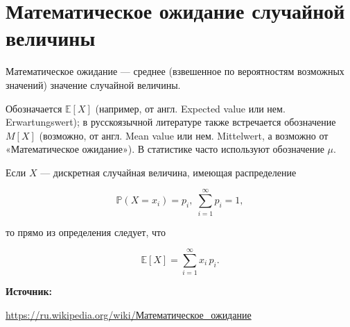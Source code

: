 \documentclass[12pt,a4paper]{scrartcl}
\begin{document}
	
\section{Математическое ожидание случайной величины}

Математическое ожидание —  среднее (взвешенное по вероятностям возможных значений) значение случайной величины.

Обозначается ${\mathbb {E}}[X]$ (например, от англ. Expected value или нем. Erwartungswert); в русскоязычной литературе также встречается обозначение $M[X]$ (возможно, от англ. Mean value или нем. Mittelwert, а возможно от «Математическое ожидание»). В статистике часто используют обозначение $\mu$. 


Если $X$ — дискретная случайная величина, имеющая распределение

$$\mathbb {P} (X=x_{i})=p_{i},\;\sum \limits _{i=1}^{\infty }p_{i}=1,$$

то прямо из определения следует, что

$$\mathbb {E} [X]=\sum \limits _{i=1}^{\infty }x_{i}\,p_{i}.$$

\textbf{Источник:}

\href{https://ru.wikipedia.org/wiki/%D0%9C%D0%B0%D1%82%D0%B5%D0%BC%D0%B0%D1%82%D0%B8%D1%87%D0%B5%D1%81%D0%BA%D0%BE%D0%B5_%D0%BE%D0%B6%D0%B8%D0%B4%D0%B0%D0%BD%D0%B8%D0%B5}{https://ru.wikipedia.org/wiki/Математическое\_ожидание}
	
\end{document}
